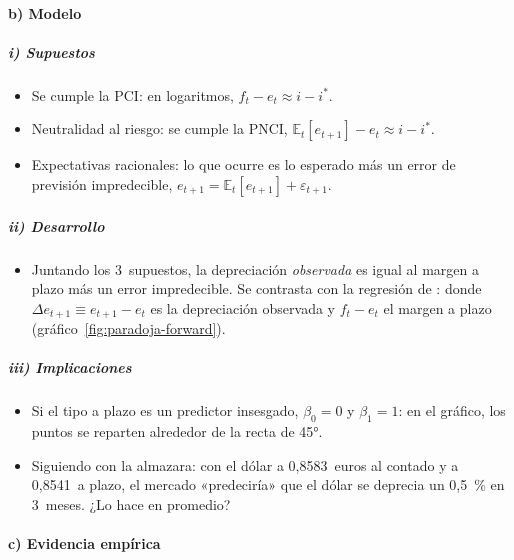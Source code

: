 \documentclass[11pt]{article}
\begin{document}
\paragraph{b) Modelo}

\subparagraph{i) Supuestos}

\begin{itemize}
\item Se cumple la PCI: en logaritmos, $f_t-e_t\approx i-i^{*}$.
\item Neutralidad al riesgo: se cumple la PNCI, $\mathbb{E}_t[e_{t+1}]-e_t\approx i-i^{*}$.
\item Expectativas racionales: lo que ocurre es lo esperado más un error de previsión impredecible, $e_{t+1}=\mathbb{E}_t[e_{t+1}]+\varepsilon_{t+1}$.
\end{itemize}

\subparagraph{ii) Desarrollo}

\begin{itemize}
\item Juntando los 3~supuestos, la depreciación \emph{observada} es igual al margen a plazo más un error impredecible. Se contrasta con la regresión de \textcite{Fama1984Forward}:
  donde $\Delta e_{t+1}\equiv e_{t+1}-e_t$ es la depreciación observada y $f_t-e_t$ el margen a plazo (gráfico~\ref{fig:paradoja-forward}).
\end{itemize}

\subparagraph{iii) Implicaciones}

\begin{itemize}
\item Si el tipo a plazo es un predictor insesgado, $\beta_0=0$ y $\beta_1=1$: en el gráfico, los puntos se reparten alrededor de la recta de 45°.
\item Siguiendo con la almazara: con el dólar a 0,8583~euros al contado y a 0,8541~a plazo, el mercado «predeciría» que el dólar se deprecia un 0,5~\% en 3~meses. ¿Lo hace en promedio?
\end{itemize}

\paragraph{c) Evidencia empírica}
\end{document}
